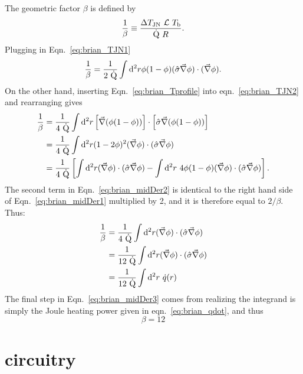 The geometric factor $\beta$ is defined by
\begin{equation}
\frac{1}{\beta}\equiv\frac{\Delta T_{\mathrm{JN}}~\mathcal{L}~T_\mathrm{b}}{\dot{\mathrm{Q}}~R}.
\end{equation}
Plugging in Eqn.~\ref{eq:brian_TJN1}
\begin{equation}
\frac{1}{\beta} = \frac{1}{2~\dot{\mathrm{Q}}}\int\mathrm{d}^2r\phi(1-\phi)(\hat\sigma\vec\nabla\phi)\cdot(\vec\nabla\phi).
\label{eq:brian_midDer1}
\end{equation}
On the other hand, inserting Eqn.~\ref{eq:brian_Tprofile} into eqn.~\ref{eq:brian_TJN2} and rearranging gives
\begin{align}
\frac{1}{\beta} &= \frac{1}{4~\dot{\mathrm{Q}}}\int\mathrm{d}^2r\left[\vec\nabla(\phi(1-\phi))\right]\cdot\left[\hat\sigma\vec\nabla(\phi(1-\phi))\right] \nonumber \\
&=\frac{1}{4~\dot{\mathrm{Q}}}\int\mathrm{d}^2r(1-2\phi)^2(\vec\nabla\phi)\cdot(\hat\sigma\vec\nabla\phi) \nonumber \\
&=\frac{1}{4~\dot{\mathrm{Q}}}\left[\int\mathrm{d}^2r(\vec\nabla\phi)\cdot(\hat\sigma\vec\nabla\phi) - \int\mathrm{d}^2r~4\phi(1-\phi)(\vec\nabla\phi)\cdot(\hat\sigma\vec\nabla\phi)\right].\label{eq:brian_midDer2}
\end{align}
The second term in Eqn.~\ref{eq:brian_midDer2} is identical to the right hand side of Eqn.~\ref{eq:brian_midDer1} multiplied by 2, and it is therefore equal to $2/\beta$. Thus:
\begin{align}
\frac{1}{\beta} &= \frac{1}{4~\dot{\mathrm{Q}}}\int\mathrm{d}^2r(\vec\nabla\phi)\cdot(\hat\sigma\vec\nabla\phi) \nonumber \\
&=\frac{1}{12~\dot{\mathrm{Q}}}\int\mathrm{d}^2r(\vec\nabla\phi)\cdot(\hat\sigma\vec\nabla\phi) \nonumber \\
&=\frac{1}{12~\dot{\mathrm{Q}}}\int\mathrm{d}^2r~\dot{q}(r)\label{eq:brian_midDer3}
\end{align}
The final step in Eqn.~\ref{eq:brian_midDer3} comes from realizing the integrand is simply the Joule heating power given in eqn.~\ref{eq:brian_qdot}, and thus
\begin{equation}
\beta = 12
\end{equation}

\section{circuitry}

